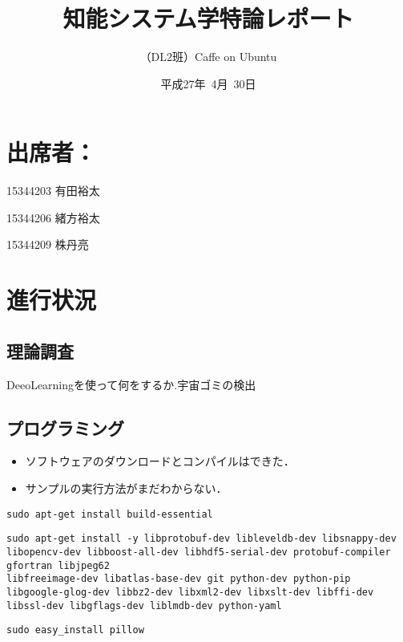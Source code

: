 \documentclass[a4paper,10pt]{jsarticle}
\title{知能システム学特論レポート}
\author{
（DL2班）Caffe on Ubuntu\\
}
\date{平成27年\ 4月\ 30日}
\begin{document}
\maketitle
\section{出席者：}
\begin{list}%
 {} %
 {} %
 \item 15344203 有田裕太
 \item 15344206 緒方裕太
 \item 15344209 株丹亮
\end{list}
\section{進行状況}
\subsection{理論調査}
DeeoLearningを使って何をするか.宇宙ゴミの検出

\subsection{プログラミング}
\begin{itemize}
 \item ソフトウェアのダウンロードとコンパイルはできた．
 \item サンプルの実行方法がまだわからない．
\end{itemize}

\begin{lstlisting}[basicstyle=\ttfamily\footnotesize, frame=single]
sudo apt-get install build-essential
\end{lstlisting}

\begin{lstlisting}[basicstyle=\ttfamily\footnotesize, frame=single]
sudo apt-get install -y libprotobuf-dev libleveldb-dev libsnappy-dev
libopencv-dev libboost-all-dev libhdf5-serial-dev protobuf-compiler gfortran libjpeg62
libfreeimage-dev libatlas-base-dev git python-dev python-pip
libgoogle-glog-dev libbz2-dev libxml2-dev libxslt-dev libffi-dev
libssl-dev libgflags-dev liblmdb-dev python-yaml
\end{lstlisting}

\begin{lstlisting}[basicstyle=\ttfamily\footnotesize, frame=single]
sudo easy_install pillow
\end{lstlisting}
\end{document}
